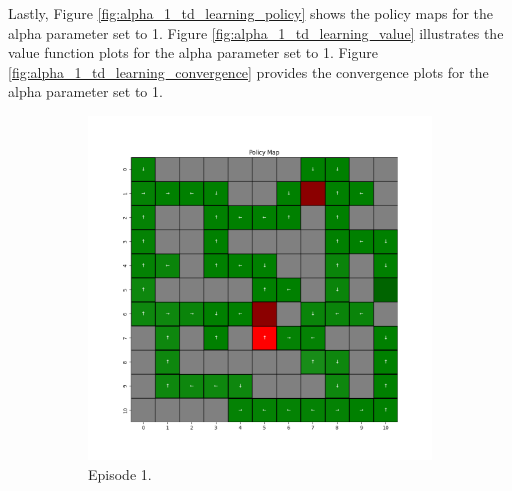 \documentclass{assignment}
\begin{document}
Lastly, Figure \ref{fig:alpha_1_td_learning_policy} shows the policy maps for the alpha parameter set to 1. Figure \ref{fig:alpha_1_td_learning_value} illustrates the value function plots for the alpha parameter set to 1. Figure \ref{fig:alpha_1_td_learning_convergence} provides the convergence plots for the alpha parameter set to 1.

\begin{figure}[H]
    \begin{subfigure}{0.3\textwidth}
        \includegraphics[width=\textwidth]{figures/policy_td/alpha_sweep/policy_alpha_1_gamma_0.95_epsilon_0.2_iteration_1.png}
    \caption{Episode 1.}
    \end{subfigure}\hfill
    \begin{subfigure}{0.3\textwidth}

\end{subfigure}
\end{figure}
\end{document}
